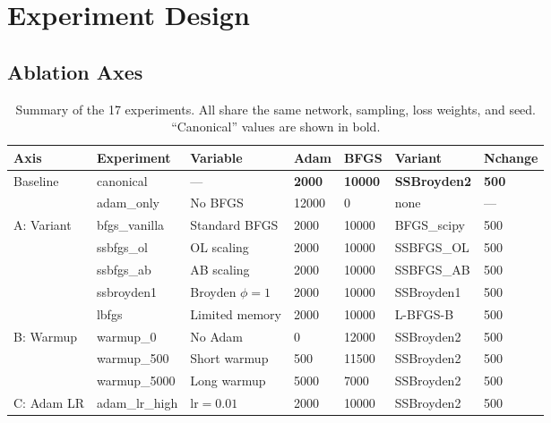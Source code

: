 \documentclass[11pt,a4paper]{article}
\begin{document}
\section{Experiment Design}
\label{sec:design}

\subsection{Ablation Axes}

\begin{table}[H]
\centering
\caption{Summary of the 17 experiments.  All share the same network,
sampling, loss weights, and seed.  ``Canonical'' values are shown in bold.}
\label{tab:experiments}
\small
\begin{tabularx}{\textwidth}{llXllll}
\toprule
\textbf{Axis} & \textbf{Experiment} & \textbf{Variable} & \textbf{Adam} & \textbf{BFGS} & \textbf{Variant} & \textbf{Nchange} \\
\midrule
\multirow{2}{*}{Baseline}
  & canonical    & ---                    & \textbf{2000} & \textbf{10000} & \textbf{SSBroyden2} & \textbf{500} \\
  & adam\_only   & No BFGS                & 12000         & 0              & none                & ---          \\
\midrule
\multirow{5}{*}{A: Variant}
  & bfgs\_vanilla  & Standard BFGS        & 2000 & 10000 & BFGS\_scipy  & 500 \\
  & ssbfgs\_ol     & OL scaling           & 2000 & 10000 & SSBFGS\_OL   & 500 \\
  & ssbfgs\_ab     & AB scaling           & 2000 & 10000 & SSBFGS\_AB   & 500 \\
  & ssbroyden1     & Broyden $\phi=1$     & 2000 & 10000 & SSBroyden1   & 500 \\
  & lbfgs          & Limited memory       & 2000 & 10000 & L-BFGS-B     & 500 \\
\midrule
\multirow{3}{*}{B: Warmup}
  & warmup\_0      & No Adam              & 0    & 12000 & SSBroyden2 & 500 \\
  & warmup\_500    & Short warmup         & 500  & 11500 & SSBroyden2 & 500 \\
  & warmup\_5000   & Long warmup          & 5000 & 7000  & SSBroyden2 & 500 \\
\midrule
\multirow{2}{*}{C: Adam LR}
  & adam\_lr\_high  & $\text{lr} = 0.01$  & 2000 & 10000 & SSBroyden2 & 500 \\

\end{tabularx}
\end{table}
\end{document}
